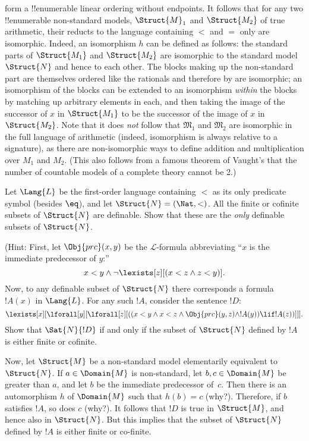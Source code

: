 \documentclass[../../include/open-logic-section]{subfiles}
\begin{document}
form a !!{enumerable} linear ordering without endpoints.  It follows
that for any two !!{enumerable} non-standard models, $\Struct{M}_1$
and $\Struct{M_2}$ of true arithmetic, their reducts to the language
containing $<$ and $=$ only are isomorphic. Indeed, an isomorphism $h$
can be defined as follows: the standard parts of $\Struct{M_1}$ and
$\Struct{M_2}$ are isomorphic to the standard model $\Struct{N}$ and
hence to each other. The blocks making up the non-standard part are
themselves ordered like the rationals and therefore by
 are isomorphic; an isomorphism of the blocks
can be extended to an isomorphism \emph{within} the blocks by matching
up arbitrary elements in each, and then taking the image of the
successor of $x$ in $\Struct{M_1}$ to be the successor of the image of
$x$ in $\Struct{M_2}$. Note that it does \emph{not} follow that
$\mathfrak{M}_1$ and $\mathfrak{M}_2$ are isomorphic in the full
language of arithmetic (indeed, isomorphism is always relative to a
signature), as there are non-isomorphic ways to define addition and
multiplication over $M_1$ and $M_2$. (This also follows from a famous
theorem of Vaught's that the number of countable models of a complete
theory cannot be 2.)


\begin{prob} 
Let $\Lang{L}$ be the first-order language containing $<$ as its only
predicate symbol (besides $\eq$), and let $\Struct{N} = (\Nat,
<)$. All the finite or cofinite subsets of $\Struct{N}$ are
definable. Show that these are the \emph{only} definable subsets of
$\Struct{N}$.
 
(Hint: First, let $\Obj{prc}(x,y)$ be the
$\mathcal{L}$-formula abbreviating ``$x$ is the immediate predecessor
of $y$:''
\[
x<y \land \lnot \lexists[z][(x<z \land z < y)].
\]
Now, to any definable subset of $\Struct{N}$ there corresponds a
formula $!A(x)$ in $\Lang{L}$. For any such $!A$,
consider the sentence $!D$:
\[
\lexists[x][\lforall[y][\lforall[z][((x<y \land x<z \land \Obj{prc}(y,z)
  \land !A(y)) \lif !A(z))]]].
\]
Show that $\Sat{N}{!D}$ if and only if the subset of
$\Struct{N}$ defined by $!A$ is either finite or cofinite.

Now, let $\Struct{M}$ be a non-standard model elementarily
equivalent to $\Struct{N}$.  If $a \in \Domain{M}$ is
non-standard, let $b, c \in \Domain{M}$ be greater than $a$, and
let $b$ be the immediate predecessor of~$c$. Then there is an
automorphism $h$ of $\Domain{M}$ such that $h(b)=c$
(why?). Therefore, if $b$ satisfies $!A$, so does $c$ (why?). It
follows that $!D$ is true in $\Struct{M}$, and hence also in
$\Struct{N}$. But this implies that the subset of $\Struct{N}$
defined by $!A$ is either finite or co-finite.
\end{prob}
\end{document}
